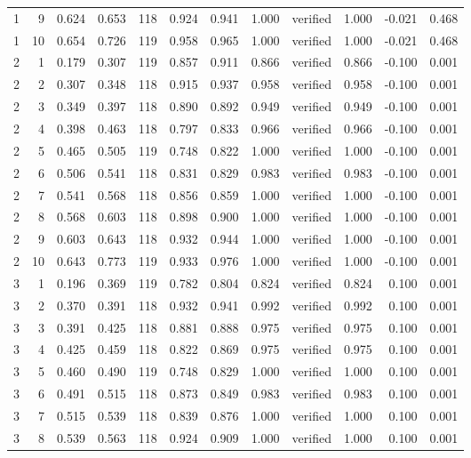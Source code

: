 \begin{tabular}{rrrrrrrrlrrr}
1 & 9 & 0.624 & 0.653 & 118 & 0.924 & 0.941 & 1.000 & verified & 1.000 & -0.021 & 0.468 \\
1 & 10 & 0.654 & 0.726 & 119 & 0.958 & 0.965 & 1.000 & verified & 1.000 & -0.021 & 0.468 \\
2 & 1 & 0.179 & 0.307 & 119 & 0.857 & 0.911 & 0.866 & verified & 0.866 & -0.100 & 0.001 \\
2 & 2 & 0.307 & 0.348 & 118 & 0.915 & 0.937 & 0.958 & verified & 0.958 & -0.100 & 0.001 \\
2 & 3 & 0.349 & 0.397 & 118 & 0.890 & 0.892 & 0.949 & verified & 0.949 & -0.100 & 0.001 \\
2 & 4 & 0.398 & 0.463 & 118 & 0.797 & 0.833 & 0.966 & verified & 0.966 & -0.100 & 0.001 \\
2 & 5 & 0.465 & 0.505 & 119 & 0.748 & 0.822 & 1.000 & verified & 1.000 & -0.100 & 0.001 \\
2 & 6 & 0.506 & 0.541 & 118 & 0.831 & 0.829 & 0.983 & verified & 0.983 & -0.100 & 0.001 \\
2 & 7 & 0.541 & 0.568 & 118 & 0.856 & 0.859 & 1.000 & verified & 1.000 & -0.100 & 0.001 \\
2 & 8 & 0.568 & 0.603 & 118 & 0.898 & 0.900 & 1.000 & verified & 1.000 & -0.100 & 0.001 \\
2 & 9 & 0.603 & 0.643 & 118 & 0.932 & 0.944 & 1.000 & verified & 1.000 & -0.100 & 0.001 \\
2 & 10 & 0.643 & 0.773 & 119 & 0.933 & 0.976 & 1.000 & verified & 1.000 & -0.100 & 0.001 \\
3 & 1 & 0.196 & 0.369 & 119 & 0.782 & 0.804 & 0.824 & verified & 0.824 & 0.100 & 0.001 \\
3 & 2 & 0.370 & 0.391 & 118 & 0.932 & 0.941 & 0.992 & verified & 0.992 & 0.100 & 0.001 \\
3 & 3 & 0.391 & 0.425 & 118 & 0.881 & 0.888 & 0.975 & verified & 0.975 & 0.100 & 0.001 \\
3 & 4 & 0.425 & 0.459 & 118 & 0.822 & 0.869 & 0.975 & verified & 0.975 & 0.100 & 0.001 \\
3 & 5 & 0.460 & 0.490 & 119 & 0.748 & 0.829 & 1.000 & verified & 1.000 & 0.100 & 0.001 \\
3 & 6 & 0.491 & 0.515 & 118 & 0.873 & 0.849 & 0.983 & verified & 0.983 & 0.100 & 0.001 \\
3 & 7 & 0.515 & 0.539 & 118 & 0.839 & 0.876 & 1.000 & verified & 1.000 & 0.100 & 0.001 \\
3 & 8 & 0.539 & 0.563 & 118 & 0.924 & 0.909 & 1.000 & verified & 1.000 & 0.100 & 0.001 \\

\end{tabular}
